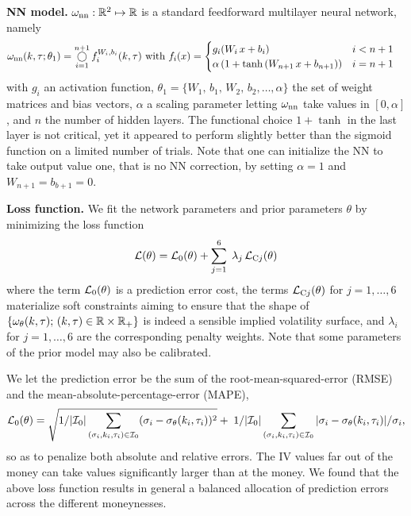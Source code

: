 \textbf{NN model.}
$\omega_{\rm nn}:{\mathbb R}^2\mapsto{\mathbb R}$ is a standard feedforward multilayer neural network, namely
\begin{align}
\omega_{\rm nn}(k, \tau;\theta_1) &=  \mathop{\bigcirc}_{i=1}^{n+1} f_i^{W_i, b_i} (k, \tau) \mbox{ with } 
f_i(x) = \begin{cases} g_i(W_i \, x + b_i) & i< n + 1
\\ \alpha \left(1 + \tanh \left(W_{n+1} \, x + b_{n+1} \right)\right) & i=n+1 \end{cases} \label{eq:ffnn_def2}
\end{align}
with $g_i$ an activation function, $\theta_1=\{W_1,\,b_1,\,W_2,\,b_2,\dots, \alpha\}$ the set of weight matrices and bias vectors, $\alpha$ a scaling parameter letting $\omega_{\rm nn}$ take values in $[0, \alpha]$, and $n$ the number of hidden layers.
The functional choice $1+\tanh$ in the last layer is not critical, yet it appeared to perform slightly better than the sigmoid function on a limited number of trials.
Note that one can initialize the NN to take output value one, that is no NN correction, by setting $\alpha=1$ and $W_{n+1}=b_{b+1}=0$.

\textbf{Loss function.}
We fit the network parameters and prior parameters $\theta$ by minimizing the loss function
\begin{equation}\label{eq:loss}
{\mathcal L} (\theta) = {\mathcal L}_0(\theta) + \sum_{j=1}^6 \; \lambda_j \, {\mathcal L}_{{\rm C} j}(\theta)
\end{equation}
where the term ${\mathcal L}_0(\theta)$ is a prediction error cost, the terms ${\mathcal L}_{{\rm C} j}(\theta)$ for $j=1,\dots,6$ materialize soft constraints aiming to ensure that the shape of $\{\omega_{\theta}(k, \tau);\, (k, \tau) \in{\mathbb R}\times{\mathbb R}_+\}$ is indeed a sensible implied volatility surface, and $\lambda_i$ for $j=1,\dots,6$ are the corresponding penalty weights.
Note that some parameters of the prior model may also be calibrated.

We let the prediction error be the sum of the root-mean-squared-error (RMSE) and the mean-absolute-percentage-error (MAPE),
\[
{\mathcal L}_0(\theta) = \sqrt{1/|{\mathcal I}_{\rm 0}|\sum_{(\sigma_i,k_i, \tau_i)\in{\mathcal I}_{\rm 0}} (\sigma_i - \sigma_{\theta}(k_i, \tau_i))^2} + \;1/|{\mathcal I}_{\rm 0}| \sum_{(\sigma_i,k_i, \tau_i)\in{\mathcal I}_{\rm 0}}  \vert \sigma_i - \sigma_{\theta}(k_i, \tau_i) \vert/\sigma_i,
\]
so as to penalize both absolute and relative errors.
The IV values far out of the money can take values significantly larger than at the money.
We found that the above loss function results in general a balanced allocation of prediction errors across the different moneynesses.

